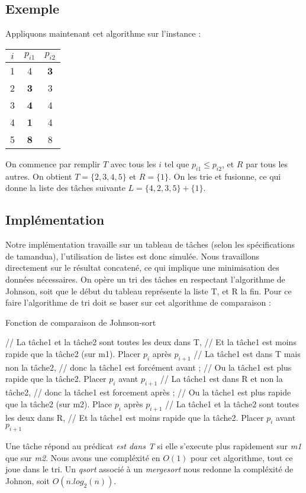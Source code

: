 \subsection{Exemple}
Appliquons maintenant cet algorithme sur l'instance :

\begin{center}
\begin{tabular}{|c|c|c|}
\hline
$i$ & $p_{i1}$ & $p_{i2}$ \\
\hline
1 & 4 & \textbf{3} \\
\hline
2 & \textbf{3} & 3 \\
\hline
3 & \textbf{4} & 4 \\
\hline
4 & \textbf{1} & 4 \\
\hline
5 & \textbf{8} & 8 \\
\hline
\end{tabular}
\end{center}

On commence par remplir $T$ avec tous les $i$ tel que $p_{i1} \le p_{i2}$, et
$R$ par tous les autres.
On obtient $T = \{2,3,4,5\}$ et $R = \{1\}$.
On les trie et fusionne, ce qui donne la liste des tâches 
suivante $L = \{4,2,3,5\} + \{1\}$.

\subsection{Implémentation}
Notre implémentation travaille sur un tableau de tâches (selon les spécifications de
tamandua), l'utilisation de listes est donc simulée.
Nous travaillons directement sur le résultat concatené, ce qui implique une
minimisation des données nécessaires. On opère un tri des tâches en respectant
l'algorithme de Johnson, soit que le début du tableau représente la liste T,
et R la fin. Pour ce faire l'algorithme de tri doit se baser sur cet algorithme
de comparaison :
\begin{algorithm}
\caption{Fonction de comparaison de Johnson-sort}
\begin{algorithmic}
		\STATE // La tâche1 et la tâche2 sont toutes les deux dans T,
		\STATE // Et la tâche1 est moins rapide que la tâche2 (sur m1).
		\STATE Placer $p_i$ après $p_{i+1}$
	\ELSE
		\STATE // La tâche1 est dans T mais non la tâche2,
		\STATE // donc la tâche1 est forcément avant ;
		\STATE // Ou la tâche1 est plus rapide que la tâche2.
		\STATE Placer $p_i$ avant $p_{i+1}$
	\ENDIF
\ELSE
		\STATE // La tâche1 est dans R et non la tâche2,
		\STATE // donc la tâche1 est forcement après ;
		\STATE // Ou la tâche1 est plus rapide que la tâche2 (sur m2).
		\STATE Place $p_i$ après $p_{i+1}$
	\ELSE
		\STATE // La tâche1 et la tâche2 sont toutes les deux dans R,
		\STATE // Et la tâche1 est moins rapide que la tâche2.
		\STATE Placer $p_i$ avant $p_{i+1}$
	\ENDIF
\ENDIF
\end{algorithmic}
\end{algorithm}

Une tâche répond au prédicat {\em est dans T} si elle s'execute plus rapidement
sur {\em m1} que sur {\em m2}.
Nous avons une compléxité en $O(1)$ pour cet algorithme, tout ce joue dans le
tri. Un {\em qsort} associé à un {\em mergesort} nous redonne la compléxité
de Johnon, soit $O(n.log_2(n))$.

